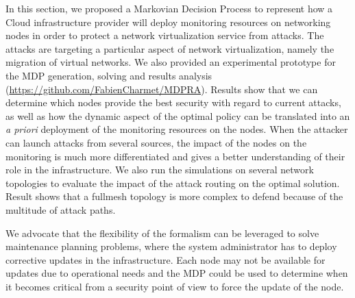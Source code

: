 \label{sec:mdp-conclusion}
In this section, we proposed a Markovian Decision Process to represent how a Cloud infrastructure provider will deploy monitoring resources on networking nodes in order to protect a network virtualization service from attacks.
The attacks are targeting a particular aspect of network virtualization, namely the migration of virtual networks.
We also provided an experimental prototype for the MDP generation, solving and results analysis  (\url{https://github.com/FabienCharmet/MDPRA}).
Results show that we can determine which nodes provide the best security with regard to current attacks, as well as how the dynamic aspect of the optimal policy can be translated into an \textit{a priori} deployment of the monitoring resources on the nodes.
When the attacker can launch attacks from several sources, the impact of the nodes on the monitoring is much more differentiated and gives a better understanding of their role in the infrastructure.
We also run the simulations on several network topologies to evaluate the impact of the attack routing on the optimal solution. Result shows that a fullmesh topology is more complex to defend because of the multitude of attack paths.

We advocate that the flexibility of the formalism can be leveraged to solve maintenance planning problems, where the system administrator has to deploy corrective updates in the infrastructure. Each node may not be available for updates due to operational needs and the MDP could be used to determine when it becomes critical from a security point of view to force the update of the node.

